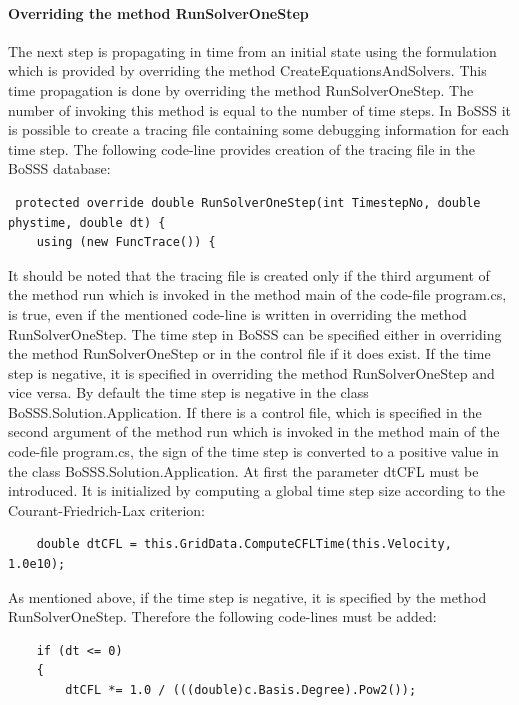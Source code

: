 \documentclass[11pt,twoside,a4paper]{fdyartcl}
\begin{document}
{\paragraph{Overriding the method {\scriptsize RunSolverOneStep}}
The next step is propagating in time from an initial state using the formulation which is provided by overriding the method {\scriptsize CreateEquationsAndSolvers}. This time propagation is done by overriding the method {\scriptsize RunSolverOneStep}. The number of invoking this method is equal to the number of time steps. In BoSSS it is possible to create a tracing file containing some debugging information for each time step. The following code-line provides creation of the tracing file in the BoSSS database:
{\scriptsize \begin{verbatim}
 protected override double RunSolverOneStep(int TimestepNo, double phystime, double dt) {
    using (new FuncTrace()) {
\end{verbatim}}
It should be noted that the tracing file is created only if the third argument of the method {\scriptsize run} which is invoked in the method {\scriptsize main} of the code-file {\scriptsize program.cs}, is {\scriptsize true}, even if the mentioned code-line is written in overriding the method {\scriptsize RunSolverOneStep}. The time step in BoSSS can be specified either in overriding the method {\scriptsize RunSolverOneStep} or in the control file if it does exist. If the time step is negative, it is specified in overriding the method {\scriptsize RunSolverOneStep} and vice versa. By default the time step is negative in the class {\scriptsize BoSSS.Solution.Application}. If there is a control file, which is specified in the second argument of the method {\scriptsize run} which is invoked in the method {\scriptsize main} of the code-file {\scriptsize program.cs}, the sign of the time step is converted to a positive value in the class {\scriptsize BoSSS.Solution.Application}. At first the parameter dtCFL must be introduced. It is initialized by computing a global time step size according to the Courant-Friedrich-Lax criterion:
{\scriptsize \begin{verbatim}
	double dtCFL = this.GridData.ComputeCFLTime(this.Velocity, 1.0e10);
	\end{verbatim}}
As mentioned above, if the time step is negative, it is specified by the method {\scriptsize RunSolverOneStep}. Therefore the following code-lines must be added:
{\scriptsize \begin{verbatim}
	if (dt <= 0)
	{
		dtCFL *= 1.0 / (((double)c.Basis.Degree).Pow2());
	

\end{verbatim}}}
\end{document}
